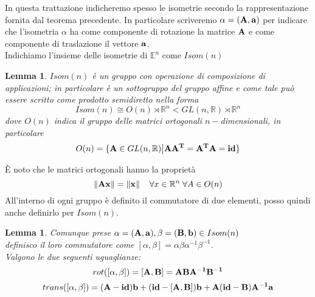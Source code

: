 \documentclass[a4paper]{book}
\newtheorem{lemma}[theorem]{Lemma}
\begin{document}
In questa trattazione indicheremo spesso le isometrie secondo la rappresentazione fornita dal teorema precedente. In particolare scriveremo $\alpha = ( \vb{A, a})  $ per indicare che l'isometria $\alpha$ ha come componente di rotazione la matrice $\vb{A}$ e come componente di traslazione il vettore $\vb{a}$. \\
Indichiamo l'insieme delle isometrie di  $\mathbb{E}^{n} $ come $Isom(n)$
\begin{lemma}
$Isom(n)$ è un gruppo con operazione di composizione di applicazioni; in particolare è un sottogruppo del gruppo affine e come tale può essere scritto come prodotto semidiretto nella forma
\[ Isom(n) \cong   O(n) \rtimes \mathbb{R}^{n} <  GL(n, \mathbb{R}) \rtimes\mathbb{R}^{n} 
\]
dove $O(n)$ indica il gruppo delle matrici ortogonali $n-$dimensionali, in particolare 
\[ O(n) = \{ \vb{A} \in GL(n, \mathbb{R}) \big| \vb{A A^{T}} = \vb{A^{T} A} = \vb{id} \}\]
\end{lemma}

\`E noto che le matrici ortogonali hanno la proprietà
\[ \norm{\vb{Ax}} = \norm{\vb{x}}   \; \; \; \; \forall x \in \mathbb{R}^n \; \forall A \in O(n)\]
All'interno di ogni gruppo è definito il commutatore di due elementi, posso quindi anche definirlo per $Isom(n)$.
\begin{lemma}
\label{lemma:1}
	Comunque prese  $ \alpha = (\vb{A,a}), \beta = (\vb{B,b}) \in Isom(n)$\\
	definisco il loro commutatore come  $ [ \alpha , \beta] = \alpha \beta \alpha^{-1} \beta^{-1}$. \\
Valgono le due seguenti uguaglianze:
\begin{equation}
rot([ \alpha	, \beta ]) = \vb{[A, B]} = \vb{ABA^{-1}B^{-1}}
\end{equation}  
\begin{equation}
trans([ \alpha	, \beta ]) = \vb{(A-id)b+(id-[A,B])b+A(id-B)A^{-1}a }
\end{equation} 
\end{lemma}
\end{document}
